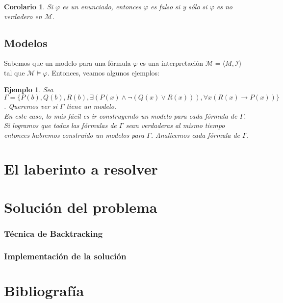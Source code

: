 \documentclass[letterpaper,12pt]{article}
\newtheorem{ejem}{Ejemplo}[]
\newtheorem{cor}{Corolario}[]
\begin{document}
    \begin{cor}
      Si $\varphi$ es un enunciado, entonces $\varphi$ es falso si y sólo si 
      $\varphi$ es no verdadero en $\mathcal{M}$.
    \end{cor}

    \subsection{Modelos}
    Sabemos que un modelo para una fórmula $\varphi$ es una interpretación 
    $\mathcal{M} = \langle M, \mathcal{I} \rangle$ tal que 
    $\mathcal{M} \models \varphi$. Entonces, veamos algunos ejemplos:
    \begin{ejem}
      Sea $\Gamma = \{ P(b), Q(b), R(b), \exists(P(x) \land 
      \neg (Q(x) \lor R(x))), \forall x (R(x) \rightarrow P(x))\}$. Queremos 
      ver si $\Gamma$ tiene un modelo. \\
      En este caso, lo más fácil es ir construyendo un modelo para cada 
      fórmula de $\Gamma$. Si logramos que todas las fórmulas de $\Gamma$ sean 
      verdaderas al mismo tiempo entonces habremos construido un modelos para 
      $\Gamma$. Analicemos cada fórmula de $\Gamma$.
    \end{ejem}

    \section{El laberinto a resolver}
    \section{Solución del problema}
    \subsubsection{Técnica de Backtracking}
    \subsubsection{Implementación de la solución}
    \section{Bibliografía}
\end{document}
